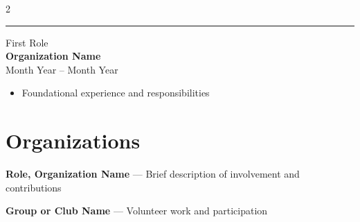 \documentclass[10pt, letterpaper]{article}
\newcommand{\resumeEntryNoLocation}[3]{%
    {\large #1} \\
    \textbf{#2} \\
    {\small \faCalendar\enspace #3}
}
\begin{document}
\begin{multicols}{2}
\vspace{6pt}\hrule\vspace{6pt}

\resumeEntryNoLocation{First Role}{Organization Name}{Month Year -- Month Year}
\begin{itemize}
    \item Foundational experience and responsibilities
\end{itemize}


\section{Organizations}

\textbf{Role, Organization Name} --- Brief description of involvement and contributions

\vspace{4pt}

\textbf{Group or Club Name} --- Volunteer work and participation

\end{multicols}
\end{document}
